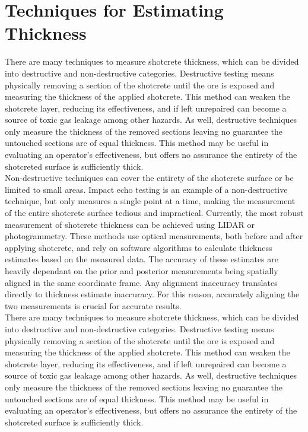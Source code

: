 \section{Techniques for Estimating Thickness}

There are many techniques to measure shotcrete thickness, which can be divided into destructive and non-destructive categories. Destructive testing means physically removing a section of the shotcrete until the ore is exposed and measuring the thickness of the applied shotcrete. This method can weaken the shotcrete layer, reducing its effectiveness, and if left unrepaired can become a source of toxic gas leakage among other hazards. As well, destructive techniques only measure the thickness of the removed sections leaving no guarantee the untouched sections are of equal thickness. This method may be useful in evaluating an operator's effectiveness, but offers no assurance the entirety of the shotcreted surface is sufficiently thick.\\

Non-destructive techniques can cover the entirety of the shotcrete surface or be limited to small areas. Impact echo testing is an example of a non-destructive technique\cite{impact}, but only measures a single point at a time, making the measurement of the entire shotcrete surface tedious and impractical. Currently, the most robust measurement of shotcrete thickness can be achieved using LIDAR or photogrammetry. These methods use optical measurements, both before and after applying shotcrete, and rely on software algorithms to calculate thickness estimates based on the measured data. The accuracy of these estimates are heavily dependant on the prior and posterior measurements being spatially aligned in the same coordinate frame. Any alignment inaccuracy translates directly to thickness estimate inaccuracy. For this reason, accurately aligning the two measurements is crucial for accurate results.\\

There are many techniques to measure shotcrete thickness, which can be divided into destructive and non-destructive categories. Destructive testing means physically removing a section of the shotcrete until the ore is exposed and measuring the thickness of the applied shotcrete. This method can weaken the shotcrete layer, reducing its effectiveness, and if left unrepaired can become a source of toxic gas leakage among other hazards. As well, destructive techniques only measure the thickness of the removed sections leaving no guarantee the untouched sections are of equal thickness. This method may be useful in evaluating an operator's effectiveness, but offers no assurance the entirety of the shotcreted surface is sufficiently thick.\\


